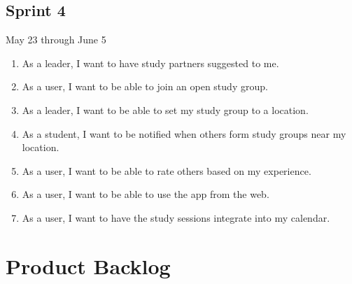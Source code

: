 \documentclass[10pt]{article}
\begin{document}
    \subsection{Sprint 4}
    May 23 through June 5
    \begin{enumerate}
        \item As a leader, I want to have study partners suggested to me.
        \item As a user, I want to be able to join an open study group.
        \item As a leader, I want to be able to set my study group to a location.
        \item As a student, I want to be notified when others form study groups near my location.
        \item As a user, I want to be able to rate others based on my experience.
        \item As a user, I want to be able to use the app from the web.
        \item As a user, I want to have the study sessions integrate into my calendar.
    \end{enumerate}

    \section{Product Backlog}
    
    
\end{document}
